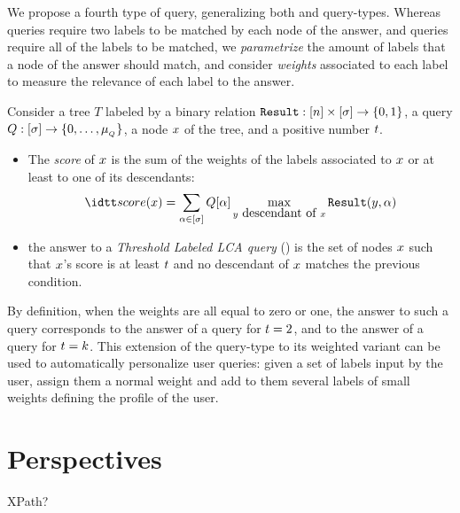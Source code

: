 We propose a fourth type of query, generalizing both {\MLCASET} and
{\SLCA} query-types.
% 
Whereas {\MLCASET} queries require two labels to be matched by each
node of the answer, and {\SLCA} queries require all of the labels to
be matched, we {\em parametrize} the amount of labels that a node of
the answer should match, and consider {\em weights} associated to each
label to measure the relevance of each label to the answer.
% 
\begin{definition}
  \label{def:TLLCA-queries}
  Consider a tree $T$ labeled by a binary relation
  $\hbox{\tt Result}:[n]\times[\sigma]\rightarrow\{0,1\}$, a query
  $Q:[\sigma]\rightarrow\{0,\ldots,\mu_{_{Q}}\}$, a node
  $x$ of the tree, and a positive number   $t$.
  
  \begin{itemize}
  \item The {\em score} of $x$ is the sum of the weights of the
    labels associated to $x$ or at least to one of its
    descendants: 
    $$\score(x) = \sum_{\labelx\in[\nblabels]} \Q[\labelx] \max_{\nodey\mbox{ descendant of }\nodex}\R(\nodey,\labelx)$$

  \item the answer to a {\em Threshold Labeled LCA query} ({\TLLCA}) is
    the set of nodes $x$ such that $x$'s score is at least
    $t$ and no descendant of $x$ matches the previous
    condition.

  \end{itemize}  
\end{definition}


By definition, when the weights are all equal to zero or one, the
answer to such a query corresponds to the answer of a {\MLCASET} query
for $t=2$, and to the answer of a {\SLCA} query for
$t=k$.
%
This extension of the query-type to its weighted variant can be used
to automatically personalize user queries: given a set of labels input
by the user, assign them a normal weight and add to them several
labels of small weights defining the profile of the user.





\section{Perspectives}
\label{sec:perspectives}

XPath?


